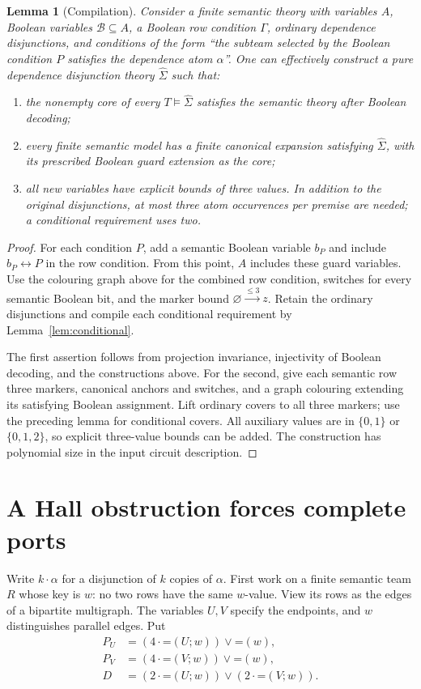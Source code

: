 \documentclass[11pt,a4paper]{article}
\newcommand{\dep}[2]{\mathord{=}(#1;#2)}
\newcommand{\con}[1]{\mathord{=}(#1)}
\newcommand{\ND}[3]{#1\xrightarrow{\leq #3}#2}
\newtheorem{lemma}[theorem]{Lemma}
\theoremstyle{definition}
\begin{document}
\begin{lemma}[Compilation]
\label{lem:compiler}
Consider a finite semantic theory with variables $A$, Boolean variables
$\mathcal B\subseteq A$, a Boolean row condition $\Gamma$, ordinary
dependence disjunctions, and conditions of the form
``the subteam selected by the Boolean condition $P$ satisfies the
dependence atom $\alpha$''. One can effectively construct a pure dependence
 disjunction theory $\widehat\Sigma$ such that:
\begin{enumerate}
\item the nonempty core of every $T\models\widehat\Sigma$ satisfies
      the semantic theory after Boolean decoding;
\item every finite semantic model has a finite canonical expansion
      satisfying $\widehat\Sigma$, with its prescribed Boolean guard
      extension as the core;
\item all new variables have explicit bounds of three values.
      In addition to the original disjunctions, at most three atom
      occurrences per premise are needed; a conditional requirement uses two.
\end{enumerate}
\end{lemma}
\begin{proof}
For each condition $P$, add a semantic Boolean variable $b_P$ and
include $b_P\leftrightarrow P$ in the row condition. From this point,
$A$ includes these guard variables. Use the colouring graph above for
the combined row condition, switches for every semantic Boolean bit,
and the marker bound $\ND\varnothing z3$. Retain the ordinary disjunctions
and compile each conditional requirement by Lemma~\ref{lem:conditional}.

The first assertion follows from projection invariance, injectivity
of Boolean decoding, and the constructions above. For the second,
give each semantic row three markers, canonical anchors and switches,
and a graph colouring extending its satisfying Boolean assignment.
Lift ordinary covers to all three markers; use the preceding lemma
for conditional covers. All auxiliary values are in $\{0,1\}$ or
$\{0,1,2\}$, so explicit three-value bounds can be added.
The construction has polynomial size in the input circuit description.
\end{proof}

\section{A Hall obstruction forces complete ports}
Write $k\cdot\alpha$ for a disjunction of $k$ copies of $\alpha$.
First work on a finite semantic team $R$ whose key is $w$: no two
rows have the same $w$-value. View its rows as the edges of a bipartite
multigraph. The variables $U,V$ specify the endpoints, and $w$
distinguishes parallel edges. Put
\begin{align}
 P_U&=(4\cdot\dep Uw)\vee\con w,\label{eq:degree-u}\\
 P_V&=(4\cdot\dep Vw)\vee\con w,\label{eq:degree-v}\\
 D&=(2\cdot\dep Uw)\vee(2\cdot\dep Vw).\label{eq:core-target}
\end{align}
\end{document}
